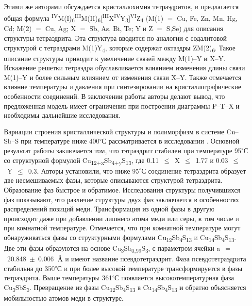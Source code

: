 Этими же авторами \cite{Johnson1988} обсуждается кристаллохимия тетраэдритов, и предлагается общая формула \textsuperscript{IV}M(I)\textsubscript{6}\textsuperscript{III}M(II)\textsubscript{6}[\textsuperscript{III}X\textsuperscript{IV}Y\textsubscript{3}]\textsuperscript{VI}Z\textsubscript{4} (M(1) $=$ Cu, Fe, Zn, Mn, Hg, Cd; M(2) $=$ Cu, Ag; X $=$ Sb, As, Bi, Te; Y и Z $=$ S,Se)  для описания структуры тетраэдрита. Эта структура вводится по аналогии с содалитовой структурой с тетраэдрами M(1)Y\textsubscript{4}, которые содержат октаэдры ZM(2)\textsubscript{6}. Такое описание структуры приводит к увеличение связей между M(1)--Y и X--Y. Искажение решетки тетраэдра обуславливается влиянием изменения длины связи M(1)--Y и более сильным влиянием от изменения связи X--Y. Также отмечается влияние температуры и давления при синтезировании на кристаллографические особенности соединений. В заключении работы авторы делают вывод, что предложенная модель имеет ограничения при построении диаграммы P--T--X и необходимы дальнейшие исследования.

Вариации строения кристаллической структуры и полиморфизм в системе Cu--Sb--S при температуре ниже 400\textsuperscript{$\circ$}С рассматривается в исследовании \cite{Tatsuka_1977}. Основной результат работы заключается том, что тэтраэдрит стабилен при температуре 95\textsuperscript{$\circ$}С со структурной формулой Cu\textsubscript{12+x}Sb\textsubscript{4+y}S\textsubscript{13}, где 0.11~$\leqslant$~X~$\leqslant$~1.77 и 0.03~$\leqslant$~Y~$\leqslant$~0.3. Авторы установили, что ниже 95\textsuperscript{$\circ$}С соединение тетраэдрита образует две несмешиваемых фазы, которые описываются структурой тетраэдрита. Образование фаз быстрое и обратимое. Исследования структуры получившихся фаз показывают, что различие структуры двух фаз заключается в особенностях распределений позиций меди. Трансформация из одной фазы в другую происходит даже при добавлении лишнего атома меди или серы, в том числе и при комнатной температуре. Отмечается, что при комнатной температуре могут обнаруживаться фазы со структурными формулами Cu\textsubscript{12}Sb\textsubscript{4}S\textsubscript{13} и Cu\textsubscript{14}Sb\textsubscript{4}S\textsubscript{13}. Две эти фазы образуются на основе Cu\textsubscript{3}Sb\textsubscript{0,99}S\textsubscript{3}, с параметром ячейки a~$=$~20.848~$\pm$~0.006~$\mbox{\normalfont\AA}$ и имеют название псевдотетраэдрит. Фаза псевдотетраэдрита стабильна до 350\textsuperscript{$\circ$}С и при более высокой температуре трансформируется в фазы тетраэдрита. Выше температуры 361\textsuperscript{$\circ$}С появляется высокотемпературная фаза Cu\textsubscript{3}SbS\textsubscript{3}. Превращение из фазы Cu\textsubscript{12}Sb\textsubscript{4}S\textsubscript{13} в Cu\textsubscript{14}Sb\textsubscript{4}S\textsubscript{13} и обратно объясняется мобильностью атомов меди в структуре.

